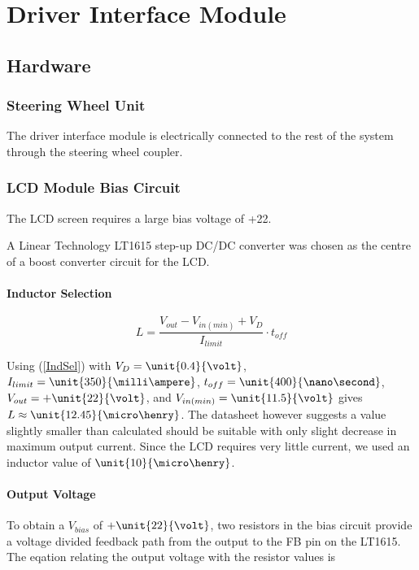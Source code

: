 \section{Driver Interface Module}

\subsection{Hardware}


\subsubsection{Steering Wheel Unit}

The driver interface module is electrically connected to the rest of the system through the steering wheel coupler.


\subsubsection{LCD Module Bias Circuit}

The LCD screen requires a large bias voltage of +\unit{22}{\volt}.

A Linear Technology LT1615 step-up DC/DC converter was chosen as the centre of a boost converter circuit for the LCD.


\paragraph{Inductor Selection}

\begin{equation}
L=\frac{V_{out}-V_{in(min)}+V_{D}}{I_{limit}}\cdot t_{off}\label{IndSel}
\end{equation}


Using (\ref{IndSel}) with $V_{D}=\unit{0.4}{\volt}$, $I_{limit}=\unit{350}{\milli\ampere}$, $t_{off}=\unit{400}{\nano\second}$, $V_{out}=+\unit{22}{\volt}$, and $V_{in(min)}=\unit{11.5}{\volt}$ gives $L\approx\unit{12.45}{\micro\henry}$. The datasheet however suggests a value slightly smaller than calculated should be suitable with only slight decrease in maximum output current. Since the LCD requires very little current, we used an inductor value of $\unit{10}{\micro\henry}$.


\paragraph{Output Voltage}

To obtain a $V_{bias}$ of $+\unit{22}{\volt}$, two resistors in the bias circuit provide a voltage divided feedback path from the output to the FB pin on the LT1615. The eqation relating the output voltage with the resistor values is

